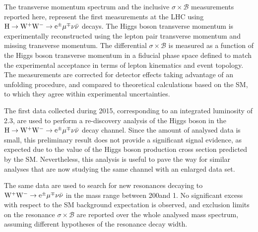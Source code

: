The transverse momentum spectrum and the inclusive $\sigma\times\mathcal{B}$ measurements reported here, represent the first measurements at the LHC using $\rm{H}\to\rm{W^+W^-}\to e^{\pm} \mu^{\mp}\nu\bar{\nu}$ decays.
The Higgs boson transverse momentum is experimentally reconstructed using the lepton pair transverse momentum and missing transverse momentum. The differential $\sigma\times\mathcal{B}$ is measured as a function of the Higgs boson transverse momentum in a fiducial phase space defined to match the experimental acceptance in terms of lepton kinematics and event topology. The measurements are corrected for detector effects taking advantage of an unfolding procedure, and compared to theoretical calculations based on the SM, to which they agree within experimental uncertainties.

The first data collected during 2015, corresponding to an integrated luminosity of 2.3\ifb, are used to perform a re-discovery analysis of the Higgs boson in the $\rm{H}\to\rm{W^+W^-}\to e^{\pm} \mu^{\mp}\nu\bar{\nu}$ decay channel. Since the amount of analysed data is small, this preliminary result does not provide a significant signal evidence, as expected due to the value of the Higgs boson production cross section predicted by the SM. Nevertheless, this analysis is useful to pave the way for similar analyses that are now studying the same channel with an enlarged data set.

The same data are used to search for new resonances decaying to $\rm{W^+W^-}\to e^{\pm} \mu^{\mp}\nu\bar{\nu}$ in the mass range between 200\GeV and 1\TeV. No significant excess with respect to the SM background expectation is observed, and exclusion limits on the resonance $\sigma\times\mathcal{B}$ are reported over the whole analysed mass spectrum, assuming different hypotheses of the resonance decay width.
